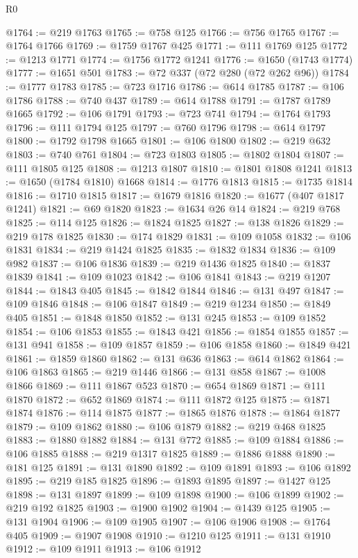 \begin{lexlean}{R0}
\begin{coremodule}
@1764 := @219 @1763
@1765 := @758 @125
@1766 := @756 @1765
@1767 := @1764 @1766
@1769 := @1759 @1767 @425
@1771 := @111 @1769 @125
@1772 := @1213 @1771
@1774 := @1756 @1772 @1241
@1776 := @1650 (@1743 @1774)
@1777 := @1651 @501
@1783 := @72 @337 (@72 @280 (@72 @262 @96))
@1784 := @1777 @1783
@1785 := @723 @1716
@1786 := @614 @1785
@1787 := @106 @1786
@1788 := @740 @437
@1789 := @614 @1788
@1791 := @1787 @1789 @1665
@1792 := @106 @1791
@1793 := @723 @741
@1794 := @1764 @1793
@1796 := @111 @1794 @125
@1797 := @760 @1796
@1798 := @614 @1797
@1800 := @1792 @1798 @1665
@1801 := @106 @1800
@1802 := @219 @632
@1803 := @740 @761
@1804 := @723 @1803
@1805 := @1802 @1804
@1807 := @111 @1805 @125
@1808 := @1213 @1807
@1810 := @1801 @1808 @1241
@1813 := @1650 (@1784 @1810) @1668
@1814 := @1776 @1813
@1815 := @1735 @1814
@1816 := @1710 @1815
@1817 := @1679 @1816
@1820 := @1677 (@407 @1817 @1241)
@1821 := @69 @1820
@1823 := @1634 @26 @14
@1824 := @219 @768
@1825 := @114 @125
@1826 := @1824 @1825
@1827 := @138 @1826
@1829 := @219 @178 @1825
@1830 := @174 @1829
@1831 := @109 @1058
@1832 := @106 @1831
@1834 := @219 @1424 @1825
@1835 := @1832 @1834
@1836 := @109 @982
@1837 := @106 @1836
@1839 := @219 @1436 @1825
@1840 := @1837 @1839
@1841 := @109 @1023
@1842 := @106 @1841
@1843 := @219 @1207
@1844 := @1843 @405
@1845 := @1842 @1844
@1846 := @131 @497
@1847 := @109 @1846
@1848 := @106 @1847
@1849 := @219 @1234
@1850 := @1849 @405
@1851 := @1848 @1850
@1852 := @131 @245
@1853 := @109 @1852
@1854 := @106 @1853
@1855 := @1843 @421
@1856 := @1854 @1855
@1857 := @131 @941
@1858 := @109 @1857
@1859 := @106 @1858
@1860 := @1849 @421
@1861 := @1859 @1860
@1862 := @131 @636
@1863 := @614 @1862
@1864 := @106 @1863
@1865 := @219 @1446
@1866 := @131 @858
@1867 := @1008 @1866
@1869 := @111 @1867 @523
@1870 := @654 @1869
@1871 := @111 @1870
@1872 := @652 @1869
@1874 := @111 @1872 @125
@1875 := @1871 @1874
@1876 := @114 @1875
@1877 := @1865 @1876
@1878 := @1864 @1877
@1879 := @109 @1862
@1880 := @106 @1879
@1882 := @219 @468 @1825
@1883 := @1880 @1882
@1884 := @131 @772
@1885 := @109 @1884
@1886 := @106 @1885
@1888 := @219 @1317 @1825
@1889 := @1886 @1888
@1890 := @181 @125
@1891 := @131 @1890
@1892 := @109 @1891
@1893 := @106 @1892
@1895 := @219 @185 @1825
@1896 := @1893 @1895
@1897 := @1427 @125
@1898 := @131 @1897
@1899 := @109 @1898
@1900 := @106 @1899
@1902 := @219 @192 @1825
@1903 := @1900 @1902
@1904 := @1439 @125
@1905 := @131 @1904
@1906 := @109 @1905
@1907 := @106 @1906
@1908 := @1764 @405
@1909 := @1907 @1908
@1910 := @1210 @125
@1911 := @131 @1910
@1912 := @109 @1911
@1913 := @106 @1912

\end{coremodule}
\end{lexlean}
